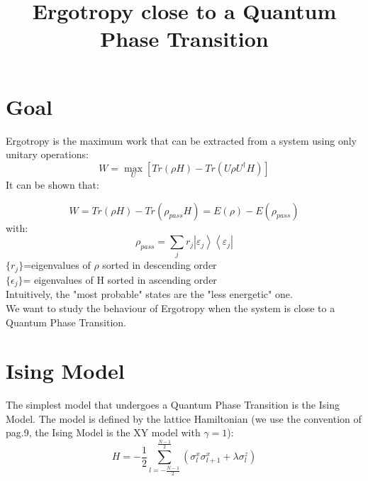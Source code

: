 \documentclass[10pt,a4paper]{article}
\title{Ergotropy close to a Quantum Phase Transition }
\author{}
\begin{document}
	\maketitle
	\section{Goal}
	 Ergotropy \cite{allahverdyan2004maximal} is the maximum work that can be extracted from a system using only unitary operations:\\
	 \begin{equation}\label{eq:ergotropy}
	 W=\max_U [ Tr(\rho H)- Tr(U\rho U^{\dagger} H) ]
	 \end{equation}
	 It can be shown \cite{allahverdyan2004maximal} that:
	
	\begin{equation}\label{eq:ergotropy2}
	W= Tr(\rho H)- Tr(\rho_{pass} H) =E(\rho)-E(\rho_{pass})
	\end{equation}
	with:
		\begin{equation}\label{eq:ergotropy3}
	\rho_{pass}=\sum_{j} r_{j}\left|\varepsilon_{j}\right\rangle\left\langle\varepsilon_{j}\right|
	\end{equation}
	$ \lbrace r_j \rbrace$=eigenvalues of $\rho$ sorted in descending order \\
	$ \lbrace \epsilon_j \rbrace$= eigenvalues of H sorted in ascending order \\
	Intuitively, the "most probable" states are the "less energetic" one.\\
	We want to study the behaviour of Ergotropy when the system is close to a Quantum Phase Transition.
	
	\section{Ising Model}
	
	The simplest model that undergoes a Quantum Phase Transition is the Ising Model.
	The model is defined by the lattice Hamiltonian (we use the convention of \cite{latorre2003ground} pag.9, the Ising Model is the XY model with $\gamma=1$):
	\begin{equation}\label{eq:hamilt}
	H=-\frac{1}{2} \sum_{l=-\frac{N-1}{2}}^{\frac{N-1}{2}}\left(\sigma_{l}^{x} \sigma_{l+1}^{x}+\lambda\sigma_{l}^{z}\right)
	\end{equation}
	
\end{document}

